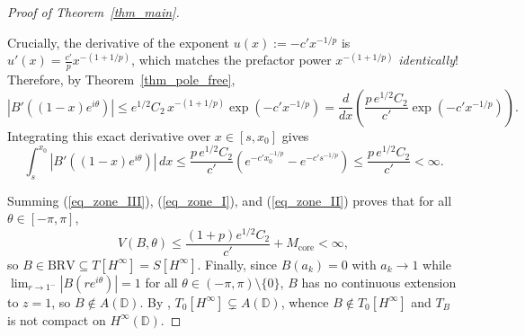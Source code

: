 \documentclass[11pt,reqno]{amsart}
\numberwithin{equation}{section}
\newcommand{\D}{\mathbb{D}}
\newcommand{\BRV}{\mathrm{BRV}}
\begin{document}
\begin{proof}[Proof of Theorem~\ref{thm_main}]
\begin{enumerate}
\[\]
Crucially, the derivative of the exponent $u(x) := -c' x^{-1/p}$ is $u'(x) = \frac{c'}{p} x^{-(1 + 1/p)}$, which matches the prefactor power $x^{-(1 + 1/p)}$ \emph{identically}! Therefore, by Theorem~\ref{thm_pole_free},
\[
  |B'((1-x)e^{i\theta})| \le e^{1/2} C_2 \, x^{-(1 + 1/p)} \exp\!\left(-c' x^{-1/p}\right)
  = \frac{d}{dx}\!\left( \frac{p \, e^{1/2} C_2}{c'} \exp\!\left(-c' x^{-1/p}\right) \right).
\]
Integrating this exact derivative over $x \in [s, x_0]$ gives
\begin{equation} \label{eq_zone_II}
  \int_s^{x_0} |B'((1-x)e^{i\theta})|\,dx \le \frac{p \, e^{1/2} C_2}{c'}\!\left(e^{-c' x_0^{-1/p}} - e^{-c' s^{-1/p}}\right) \le \frac{p \, e^{1/2} C_2}{c'} < \infty.
\end{equation}
\end{enumerate}
Summing (\ref{eq_zone_III}), (\ref{eq_zone_I}), and (\ref{eq_zone_II}) proves that for all $\theta \in [-\pi, \pi]$,
\begin{equation} \label{eq_total_BRV_bound}
  V(B, \theta) \le \frac{(1 + p) e^{1/2} C_2}{c'} + M_{\mathrm{core}} < \infty,
\end{equation}
so $B \in \BRV \subseteq T[H^\infty] = S[H^\infty]$. Finally, since $B(a_k) = 0$ with $a_k \to 1$ while $\lim_{r \to 1^-} |B(r e^{i\theta})| = 1$ for all $\theta \in (-\pi, \pi) \setminus \{0\}$, $B$ has no continuous extension to $z = 1$, so $B \notin A(\D)$. By \cite[Theorem~3.5]{AJS14}, $T_0[H^\infty] \subsetneq A(\D)$, whence $B \notin T_0[H^\infty]$ and $T_B$ is not compact on $H^\infty(\D)$.
\end{proof}
\end{document}
